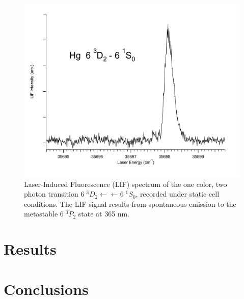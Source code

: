 \documentclass[12pt]{mitthesis}
\begin{document}
\begin{figure}
  \caption{Laser-Induced Fluorescence (LIF) spectrum of the one color,
    two photon transition  $6\;^3D_2 \leftarrow \leftarrow
    6\;^1S_0$, recorded under static cell conditions.  The LIF signal
    results from spontaneous emission to the metastable $6\;^3P_2$
    state at 365 nm.}
  \label{fig:hg3d2-cell}
  \centering
  \includegraphics[width=6in]{Hg3D2-cell.pdf}
\end{figure}


\section{Results}

\section{Conclusions}

 

\end{document}
